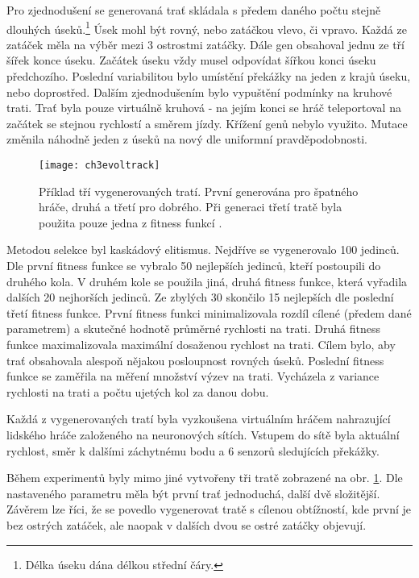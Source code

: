 Pro zjednodušení se generovaná trať skládala s předem daného počtu stejně dlouhých úseků.\footnote{Délka úseku dána délkou střední čáry.} Úsek mohl být rovný, nebo zatáčkou vlevo, či vpravo. Každá ze zatáček měla na výběr mezi 3 ostrostmi zatáčky. Dále gen obsahoval jednu ze tří šířek konce úseku. Začátek úseku vždy musel odpovídat šířkou konci úseku předchozího. Poslední variabilitou bylo umístění překážky na jeden z krajů úseku, nebo doprostřed. Dalším zjednodušením bylo vypuštění podmínky na kruhové trati. Trať byla pouze virtuálně kruhová - na jejím konci se hráč teleportoval na začátek se stejnou rychlostí a směrem jízdy. Křížení genů nebylo využito. Mutace změnila náhodně jeden z úseků na nový dle uniformní pravděpodobnosti.

\begin{figure}
  \centering
  \texttt{[image: ch3evoltrack]}
	\caption{Příklad tří vygenerovaných tratí. První generována pro špatného hráče, druhá a třetí pro dobrého. Při generaci třetí tratě byla použita pouze jedna z fitness funkcí \cite{EvolTrack}. }
	\label{fig-ch3evoltrack}
\end{figure}

Metodou selekce byl kaskádový elitismus. Nejdříve se vygenerovalo 100 jedinců. Dle první fitness funkce se vybralo 50 nejlepších jedinců, kteří postoupili do druhého kola. V druhém kole se použila jiná, druhá fitness funkce, která vyřadila dalších 20 nejhorších jedinců. Ze zbylých 30 skončilo 15 nejlepších dle poslední třetí fitness funkce. První fitness funkci minimalizovala rozdíl cílené (předem dané parametrem) a skutečné hodnotě průměrné rychlosti na trati. Druhá fitness funkce maximalizovala maximální dosaženou rychlost na trati. Cílem bylo, aby trať obsahovala alespoň nějakou posloupnost rovných úseků. Poslední fitness funkce se zaměřila na měření množství výzev na trati. Vycházela z variance rychlosti na trati a počtu ujetých kol za danou dobu. 

Každá z vygenerovaných tratí byla vyzkoušena virtuálním hráčem nahrazující lidského hráče založeného na neuronových sítích. Vstupem do sítě byla aktuální rychlost, směr k dalšími záchytnému bodu a 6 senzorů sledujících překážky.

Během experimentů byly mimo jiné vytvořeny tři tratě zobrazené na obr. \ref{fig-ch3evoltrack}. Dle nastaveného parametru měla být první trať jednoduchá, další dvě složitější. Závěrem lze říci, že se povedlo vygenerovat tratě s cílenou obtížností, kde první je bez ostrých zatáček, ale naopak v dalších dvou se ostré zatáčky objevují.

